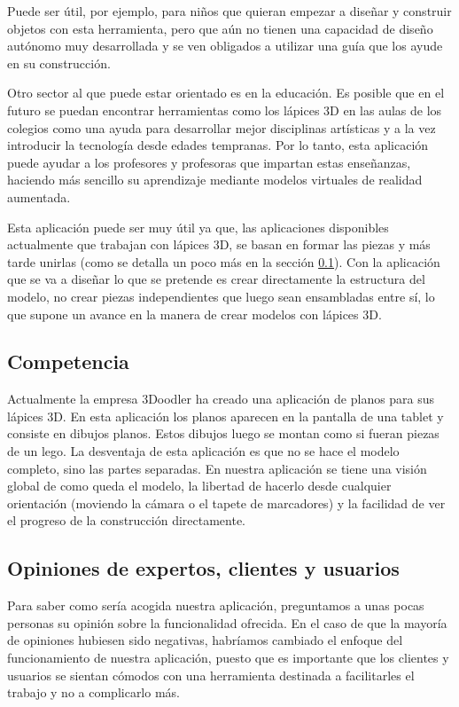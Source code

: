 \documentclass[12pt,a4paper]{article}
\begin{document}
Puede ser útil, por ejemplo, para niños que quieran empezar a diseñar y construir objetos con esta herramienta, pero que aún no tienen una capacidad de diseño autónomo muy desarrollada y se ven obligados a utilizar una guía que los ayude en su construcción.

Otro sector al que puede estar orientado es en la educación. Es posible que en el futuro se puedan encontrar herramientas como los lápices 3D en las aulas de los colegios como una ayuda para desarrollar mejor disciplinas artísticas y a la vez introducir la tecnología desde edades tempranas. Por lo tanto, esta aplicación puede ayudar a los profesores y profesoras que impartan estas enseñanzas, haciendo más sencillo su aprendizaje mediante modelos virtuales de realidad aumentada.

Esta aplicación puede ser muy útil ya que, las aplicaciones disponibles actualmente que trabajan con lápices 3D, se basan en formar las piezas y más tarde unirlas (como se detalla un poco más en la sección \ref{competencia}). Con la aplicación que se va a diseñar lo que se pretende es crear directamente la estructura del modelo, no crear piezas independientes que luego sean ensambladas entre sí, lo que supone un avance en la manera de crear modelos con lápices 3D.

\subsection{Competencia} \label{competencia}

Actualmente la empresa 3Doodler ha creado una aplicación de planos para sus lápices 3D. En esta aplicación los planos aparecen en la pantalla de una tablet y consiste en dibujos planos. Estos dibujos luego se montan como si fueran piezas de un lego. La desventaja de esta aplicación es que no se hace el modelo completo, sino las partes separadas. En nuestra aplicación se tiene una visión global de como queda el modelo, la libertad de hacerlo desde cualquier orientación (moviendo la cámara o el tapete de marcadores) y la facilidad de ver el progreso de la construcción directamente.

\subsection{Opiniones de expertos, clientes y usuarios}
Para saber como sería acogida nuestra aplicación, preguntamos a unas pocas personas su opinión sobre la funcionalidad ofrecida. En el caso de que la mayoría de opiniones hubiesen sido negativas, habríamos cambiado el enfoque del funcionamiento de nuestra aplicación, puesto que es importante que los clientes y usuarios se sientan cómodos con una herramienta destinada a facilitarles el trabajo y no a complicarlo más.
\end{document}
